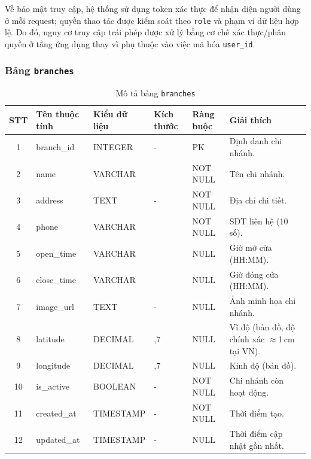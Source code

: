 \documentclass[../DoAn.tex]{subfiles}
\begin{document}
Về bảo mật truy cập, hệ thống sử dụng token xác thực để nhận diện người dùng ở mỗi request; quyền thao tác được kiểm soát theo \texttt{role} và phạm vi dữ liệu hợp lệ. Do đó, nguy cơ truy cập trái phép được xử lý bằng cơ chế xác thực/phân quyền ở tầng ứng dụng thay vì phụ thuộc vào việc mã hóa \texttt{user\_id}.

\subsubsection{Bảng \texttt{branches}}

\begin{table}[H]
\centering
\renewcommand{\arraystretch}{1.3}
\small
\begin{tabularx}{\textwidth}{|c|>{\RaggedRight\arraybackslash}p{2.9cm}|>{\Centering\arraybackslash}p{2.2cm}|>{\Centering\arraybackslash}p{1.3cm}|>{\Centering\arraybackslash}p{2.2cm}|>{\RaggedRight\arraybackslash}X|}
\hline
\textbf{STT} & \textbf{Tên thuộc tính} & \textbf{Kiểu dữ liệu} & \textbf{Kích thước} & \textbf{Ràng buộc} & \textbf{Giải thích} \\
\hline
1 & branch\_id & INTEGER & - & PK & Định danh chi nhánh. \\ \hline
2 & name & VARCHAR & 50 & NOT NULL & Tên chi nhánh. \\ \hline
3 & address & TEXT & - & NOT NULL & Địa chỉ chi tiết. \\ \hline
4 & phone & VARCHAR & 10 & NOT NULL & SĐT liên hệ (10 số). \\ \hline
5 & open\_time & VARCHAR & 8 & NULL & Giờ mở cửa (HH:MM). \\ \hline
6 & close\_time & VARCHAR & 8 & NULL & Giờ đóng cửa (HH:MM). \\ \hline
7 & image\_url & TEXT & - & NULL & Ảnh minh họa chi nhánh. \\ \hline
8 & latitude & DECIMAL & 10,7 & NULL & Vĩ độ (bản đồ, độ chính xác $\approx$1\,cm tại VN). \\ \hline
9 & longitude & DECIMAL & 10,7 & NULL & Kinh độ (bản đồ). \\ \hline
10 & is\_active & BOOLEAN & - & NOT NULL & Chi nhánh còn hoạt động. \\ \hline
11 & created\_at & TIMESTAMP & - & NOT NULL & Thời điểm tạo. \\ \hline
12 & updated\_at & TIMESTAMP & - & NULL & Thời điểm cập nhật gần nhất. \\ \hline
\end{tabularx}
\caption{Mô tả bảng \texttt{branches}}
\end{table}
\end{document}
